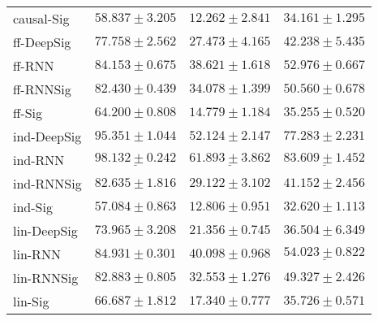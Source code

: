 \begin{tabular}{llll}
causal-Sig     &                           $ 58.837 \pm 3.205 $ &                           $ 12.262 \pm 2.841 $ &                           $ 34.161 \pm 1.295 $ \\
ff-DeepSig     &                           $ 77.758 \pm 2.562 $ &                           $ 27.473 \pm 4.165 $ &                           $ 42.238 \pm 5.435 $ \\
ff-RNN         &                           $ 84.153 \pm 0.675 $ &                           $ 38.621 \pm 1.618 $ &                           $ 52.976 \pm 0.667 $ \\
ff-RNNSig      &                           $ 82.430 \pm 0.439 $ &                           $ 34.078 \pm 1.399 $ &                           $ 50.560 \pm 0.678 $ \\
ff-Sig         &                           $ 64.200 \pm 0.808 $ &                           $ 14.779 \pm 1.184 $ &                           $ 35.255 \pm 0.520 $ \\
ind-DeepSig    &               $  \mathbf{ 95.351 \pm 1.044 } $ &               $  \mathbf{ 52.124 \pm 2.147 } $ &               $  \mathbf{ 77.283 \pm 2.231 } $ \\
ind-RNN        &  $  \mathbf{ \underline{ 98.132 \pm 0.242 }} $ &  $  \mathbf{ \underline{ 61.893 \pm 3.862 }} $ &  $  \mathbf{ \underline{ 83.609 \pm 1.452 }} $ \\
ind-RNNSig     &                           $ 82.635 \pm 1.816 $ &                           $ 29.122 \pm 3.102 $ &                           $ 41.152 \pm 2.456 $ \\
ind-Sig        &                           $ 57.084 \pm 0.863 $ &                           $ 12.806 \pm 0.951 $ &                           $ 32.620 \pm 1.113 $ \\
lin-DeepSig    &                           $ 73.965 \pm 3.208 $ &                           $ 21.356 \pm 0.745 $ &                           $ 36.504 \pm 6.349 $ \\
lin-RNN        &                           $ 84.931 \pm 0.301 $ &                           $ 40.098 \pm 0.968 $ &            $  \underline{ 54.023 \pm 0.822 } $ \\
lin-RNNSig     &                           $ 82.883 \pm 0.805 $ &                           $ 32.553 \pm 1.276 $ &                           $ 49.327 \pm 2.426 $ \\
lin-Sig        &                           $ 66.687 \pm 1.812 $ &                           $ 17.340 \pm 0.777 $ &                           $ 35.726 \pm 0.571 $ \\

\end{tabular}
